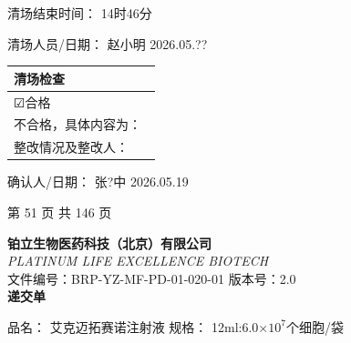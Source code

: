 \documentclass[UTF8,10pt,a4paper,fontset=fandol]{ctexart}
\newcommand{\fieldvalue}[1]{#1}
\newcommand{\handwritten}[1]{#1}
\newcommand{\checkboxfield}[1]{\ifstrequal{#1}{checked}{☑}{\ifstrequal{#1}{unclear}{?}{☐}}}
\begin{document}
\noindent
清场结束时间：
\fieldvalue{\handwritten{14时46分}}

\noindent
清场人员/日期：
\fieldvalue{\handwritten{赵小明}}
\hspace{2em}
\fieldvalue{\handwritten{2026.05.??}}

\begin{center}
\begin{tabular}{|p{0.95\linewidth}|}
\hline
清场检查 \\
\hline
\fieldvalue{\handwritten{\checkboxfield{checked}}}合格 \\
\hline
不合格，具体内容为： \\
整改情况及整改人： \\
\hline
\end{tabular}
\end{center}

\noindent
确认人/日期：
\fieldvalue{\handwritten{张?中}}
\hspace{2em}
\fieldvalue{\handwritten{2026.05.19}}

\begin{center}
第 51 页 共 146 页
\end{center}

\newpage

\begin{center}
\textbf{铂立生物医药科技（北京）有限公司}\\
\textit{PLATINUM LIFE EXCELLENCE BIOTECH}\\[0.5em]
文件编号：BRP-YZ-MF-PD-01-020-01 \qquad 版本号：2.0\\
\textbf{递交单}
\end{center}


\noindent
品名：
\fieldvalue{艾克迈拓赛诺注射液}
\hfill
规格：
\fieldvalue{12ml:6.0$\times 10^{7}$个细胞/袋}
\end{document}
